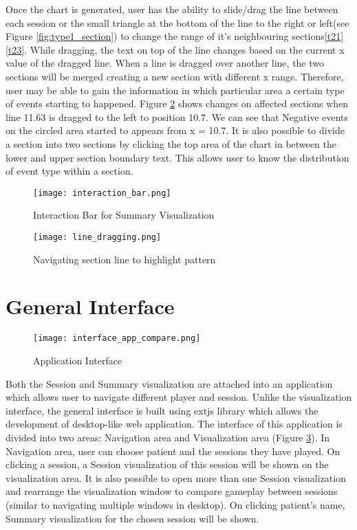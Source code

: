 Once the chart is generated, user has the ability to slide/drag the line between each session or the small triangle at the bottom of the line to the right or left(see Figure \ref{fig:type1_section}) to change the range of it's neighbouring sections\ref{t21}\ref{t23}. While dragging, the text on top of the line changes based on the current x value of the dragged line. When a line is dragged over another line, the two sections will be merged creating a new section with different x range. Therefore, user may be able to gain the information in which particular area a certain type of events starting to happened. Figure \ref{fig:line_dragging} shows changes on affected sections when line 11.63 is dragged to the left to position 10.7. We can see that Negative events on the circled area started to appears from x = 10.7. It is also possible to divide a section into two sections by clicking the top area of the chart in between the lower and upper section boundary text. This allows user to know the distribution of event type within a section.

\begin{figure}
\centering
\texttt{[image: interaction\_bar.png]}
\caption{Interaction Bar for Summary Visualization}
\label{fig:interaction_bar}
\end{figure}
\begin{figure}
\centering
\texttt{[image: line\_dragging.png]}
\caption{Navigating section line to highlight pattern}
\label{fig:line_dragging}
\end{figure}

\section{General Interface}
\begin{figure}[H]
\centering
\texttt{[image: interface\_app\_compare.png]}
\caption{Application Interface}
\label{fig:app_interface}
\end{figure}
Both the Session and Summary visualization are attached into an application which allows user to navigate different player and session. Unlike the visualization interface, the general interface is built using extjs library which allows the development of desktop-like web application. The interface of this application is divided into two areas: Navigation area and Visualization area (Figure \ref{fig:app_interface}). In Navigation area, user can choose patient and the sessions they have played. On clicking a session, a Session visualization of this session will be shown on the visualization area. It is also possible to open more than one Session visualization and rearrange the visualization window to compare gameplay between sessions (similar to navigating multiple windows in desktop). On clicking patient's name, Summary visualization for the chosen session will be shown.
